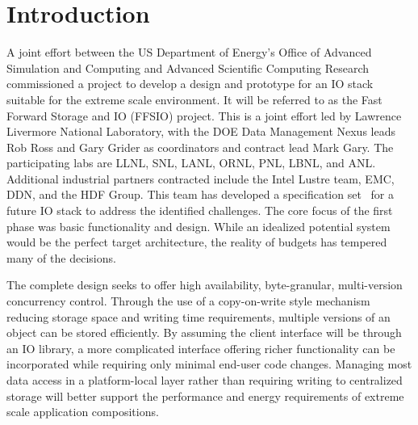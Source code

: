 \documentclass{sig-alt-gov2}
\begin{document}


\section{Introduction}


A joint effort between the US Department of
Energy's Office of Advanced Simulation and Computing and Advanced Scientific
Computing Research commissioned a project to develop a design and prototype for
an IO stack suitable for the extreme scale environment. It will be referred to
as the Fast Forward Storage and IO (FFSIO) project. This is a joint effort led
by Lawrence Livermore National Laboratory, with the DOE Data Management Nexus
leads Rob Ross and Gary Grider as coordinators and contract lead Mark Gary. The
participating labs are LLNL, SNL, LANL, ORNL, PNL, LBNL, and ANL.  Additional
industrial partners contracted include the Intel Lustre team, EMC, DDN, and the
HDF Group. This team has developed a specification
set~\cite{fastforward:2014:docs} for a future IO stack to address the
identified challenges. The core focus of the first phase
was basic functionality and design. While an idealized potential system would
be the perfect target architecture, the reality of budgets has tempered many of
the decisions.

The complete design seeks to offer high availability, byte-granular,
multi-version concurrency control. Through the use of a copy-on-write style
mechanism reducing storage space and writing time requirements, multiple
versions of an object can be stored efficiently. By assuming the client
interface will be through an IO library, a more complicated interface offering
richer functionality can be incorporated while requiring only minimal end-user
code changes.  Managing most data access in a platform-local layer rather than
requiring writing to centralized storage will better support the performance
and energy requirements of extreme scale application compositions.
\end{document}
